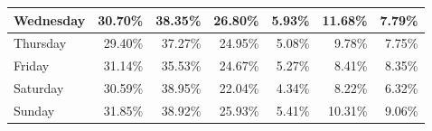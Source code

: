 \documentclass[runningheads]{llncs}
\begin{document}
\begin{table}[]
{\begin{tabular}{|l|r|r|r|r|r|r|}
Wednesday              & 30.70\%                                                                                      & 38.35\%                                                                                          & 26.80\%                               & 5.93\%                                                                                  & 11.68\%                                                                                       & 7.79\%                                         \\ \hline
Thursday               & 29.40\%                                                                                      & 37.27\%                                                                                          & 24.95\%                               & 5.08\%                                                                                  & 9.78\%                                                                                        & 7.75\%                                         \\ \hline
Friday                 & 31.14\%                                                                                      & 35.53\%                                                                                          & 24.67\%                               & 5.27\%                                                                                  & 8.41\%                                                                                        & 8.35\%                                         \\ \hline
Saturday               & 30.59\%                                                                                      & 38.95\%                                                                                          & 22.04\%                               & 4.34\%                                                                                  & 8.22\%                                                                                        & 6.32\%                                         \\ \hline
Sunday                 & 31.85\%                                                                                      & 38.92\%                                                                                          & 25.93\%                               & 5.41\%                                                                                  & 10.31\%                                                                                       & 9.06\%                                         \\ \hline

\end{tabular}}
\end{table}
\end{document}
